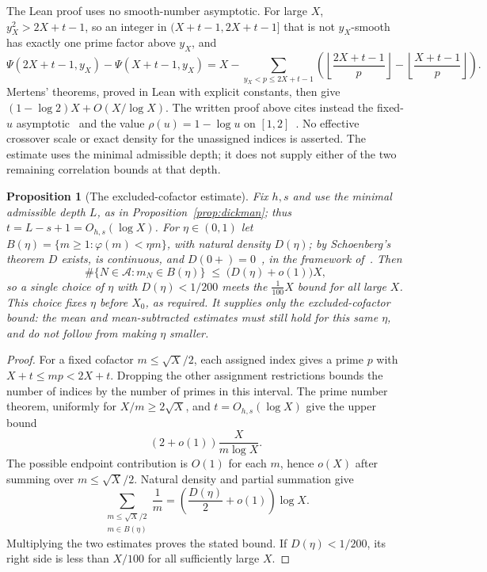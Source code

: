 \documentclass[11pt]{article}
\theoremstyle{plain}
\newtheorem{prop}[thm]{Proposition}
\theoremstyle{definition}
\theoremstyle{remark}
\providecommand{\m}[1]{\ensuremath{#1}}
\begin{document}
\noindent
The Lean proof uses no smooth-number asymptotic. For large $X$,
$y_X^2>2X+t-1$, so an integer in $(X+t-1,2X+t-1]$ that is not
$y_X$-smooth has exactly one prime factor above $y_X$, and
\[
 \Psi(2X+t-1,y_X)-\Psi(X+t-1,y_X)
 =X-\sum_{y_X<p\le2X+t-1}
 \left(\left\lfloor\frac{2X+t-1}{p}\right\rfloor
      -\left\lfloor\frac{X+t-1}{p}\right\rfloor\right).
\]
Mertens' theorems, proved in Lean with explicit constants,
then give $(1-\log2)X+O(X/\log X)$. The written proof above
cites instead the fixed-$u$
asymptotic~\cite[(1.1), p.~268]{granville-smooth} and the value
$\rho(u)=1-\log u$ on $[1,2]$~\cite[(1.3), p.~268]{granville-smooth}.
No effective crossover scale or exact density for the unassigned indices
is asserted. The estimate uses the minimal admissible depth; it does not
supply either of the two remaining correlation bounds at that depth.

\begin{prop}[The excluded-cofactor estimate]\label{prop:badcof}
Fix $h,s$ and use the minimal admissible depth $L$, as in
Proposition~\ref{prop:dickman}; thus $t=L-s+1=O_{h,s}(\log X)$.
For $\eta\in(0,1)$ let $B(\eta)=\{m\ge1:\varphi(m)<\eta m\}$, with natural density
$D(\eta)$; by Schoenberg's theorem $D$ exists, is continuous, and
$D(0+)=0$~\cite[\S17, p.~193]{schoenberg1928}, in the framework
of~\cite[Theorem~1, pp.~318--319, and \S8, p.~323]{schoenberg1936}. Then
\[
  \#\{N\in\mathcal A:m_N\in B(\eta)\}
  \;\le\;\bigl(D(\eta)+o(1)\bigr)X ,
\]
so a single choice of $\eta$ with $D(\eta)<1/200$ meets the $\tfrac{1}{100}X$
bound for all large $X$. This choice fixes $\eta$ before $X_0$, as
required. It supplies only the excluded-cofactor bound: the mean and
mean-subtracted estimates must still hold for this same $\eta$, and do
not follow from making $\eta$ smaller.
\end{prop}

\begin{proof}
For a fixed cofactor $m\le\sqrt X/2$, each assigned index gives a prime
$p$ with $X+t\le mp<2X+t$. Dropping the other assignment restrictions
bounds the number of indices by the number of primes in this interval.
The prime number theorem, uniformly for $X/m\ge2\sqrt X$, and
$t=O_{h,s}(\log X)$ give the upper bound
\[
 (2+o(1))\frac{X}{m\log X}.
\]
The possible endpoint contribution is $O(1)$ for each $m$, hence $o(X)$
after summing over $m\le\sqrt X/2$. Natural density and partial summation
give
\[
 \sum_{\substack{m\le\sqrt X/2\\m\in B(\eta)}}\frac1m
       =\left(\frac{D(\eta)}2+o(1)\right)\log X.
\]
Multiplying the two estimates proves the stated bound. If
$D(\eta)<1/200$, its right side is less than $X/100$ for all sufficiently
large $X$.
\end{proof}
\end{document}
